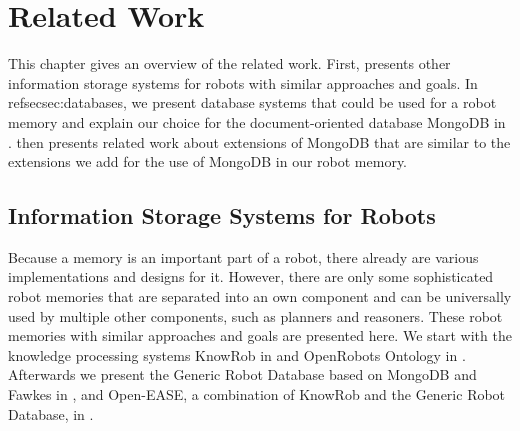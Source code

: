 \chapter{Related Work}
\label{chap:related}
This chapter gives an overview of the related work. First,
 presents other information storage systems for
robots with similar
 approaches and
goals. In refsec{sec:databases}, we present database systems that
could be used for a robot memory and explain our choice for the
document-oriented database MongoDB in
.  then
presents related work about extensions of MongoDB that are similar to
the extensions we add for the use of MongoDB in our robot memory.

\section{Information Storage Systems for Robots}
\label{sec:rw-robmems}
Because a memory is an important part of a robot, there already are
various implementations and designs for it. However, there are only
some sophisticated robot memories that are separated into an own
component and can be universally used by multiple other components,
such as planners and reasoners. These robot memories with similar
approaches and goals are presented here. We start with the knowledge
processing systems KnowRob in  and OpenRobots
Ontology in . Afterwards we present the Generic Robot
Database based on MongoDB and Fawkes in ,
and Open-EASE, a combination of KnowRob and the Generic Robot
Database, in .


